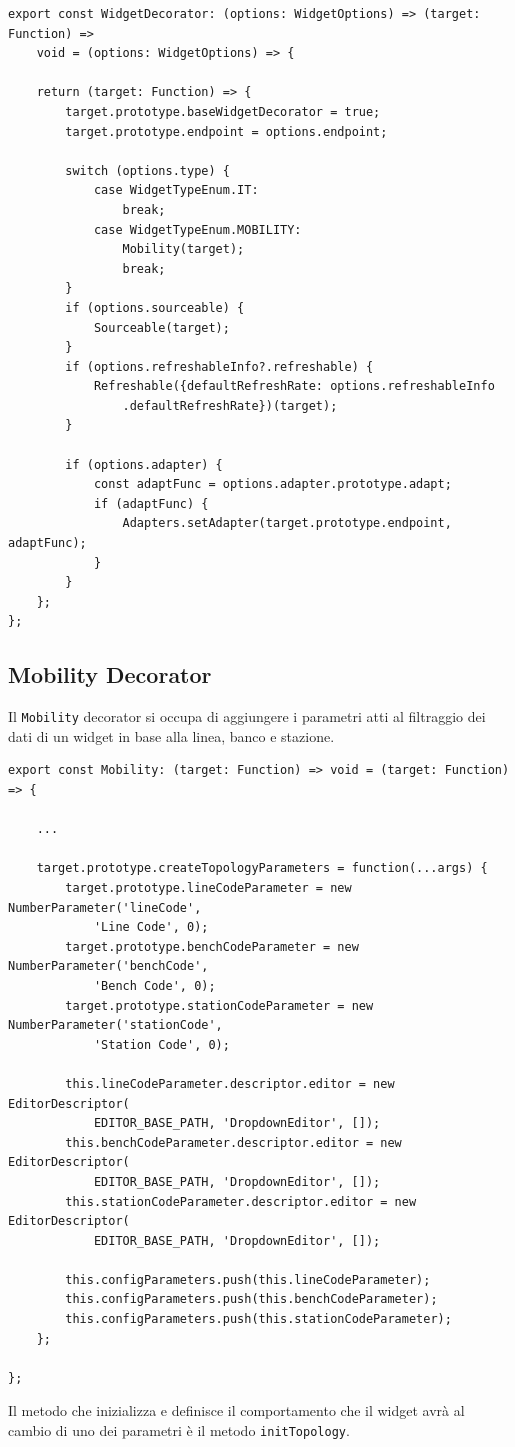 \begin{lstlisting}[caption={Decorator factory WidgetDecorator}, style=javaScriptCode]
export const WidgetDecorator: (options: WidgetOptions) => (target: Function) => 
    void = (options: WidgetOptions) => {

    return (target: Function) => {
        target.prototype.baseWidgetDecorator = true;
        target.prototype.endpoint = options.endpoint;

        switch (options.type) {
            case WidgetTypeEnum.IT:
                break;
            case WidgetTypeEnum.MOBILITY:
                Mobility(target);
                break;
        }
        if (options.sourceable) {
            Sourceable(target);
        }
        if (options.refreshableInfo?.refreshable) {
            Refreshable({defaultRefreshRate: options.refreshableInfo
                .defaultRefreshRate})(target);
        }

        if (options.adapter) {
            const adaptFunc = options.adapter.prototype.adapt;
            if (adaptFunc) {
                Adapters.setAdapter(target.prototype.endpoint, adaptFunc);
            }
        }
    };
};
\end{lstlisting}
\subsection{Mobility Decorator}
Il \verb|Mobility| decorator si occupa di aggiungere i parametri atti al filtraggio dei dati di un widget in base alla linea, banco e stazione.

\begin{lstlisting}[caption={Metodo di creazione dei parametri all'interno del decorator Mobility}, style=javaScriptCode]
export const Mobility: (target: Function) => void = (target: Function) => {

    ...

    target.prototype.createTopologyParameters = function(...args) {
        target.prototype.lineCodeParameter = new NumberParameter('lineCode', 
            'Line Code', 0);
        target.prototype.benchCodeParameter = new NumberParameter('benchCode', 
            'Bench Code', 0);
        target.prototype.stationCodeParameter = new NumberParameter('stationCode', 
            'Station Code', 0);

        this.lineCodeParameter.descriptor.editor = new EditorDescriptor(
            EDITOR_BASE_PATH, 'DropdownEditor', []);
        this.benchCodeParameter.descriptor.editor = new EditorDescriptor(
            EDITOR_BASE_PATH, 'DropdownEditor', []);
        this.stationCodeParameter.descriptor.editor = new EditorDescriptor(
            EDITOR_BASE_PATH, 'DropdownEditor', []);

        this.configParameters.push(this.lineCodeParameter);
        this.configParameters.push(this.benchCodeParameter);
        this.configParameters.push(this.stationCodeParameter);
    };

};
\end{lstlisting}
Il metodo che inizializza e definisce il comportamento che il widget avrà al cambio di uno dei parametri è il metodo \verb|initTopology|.

